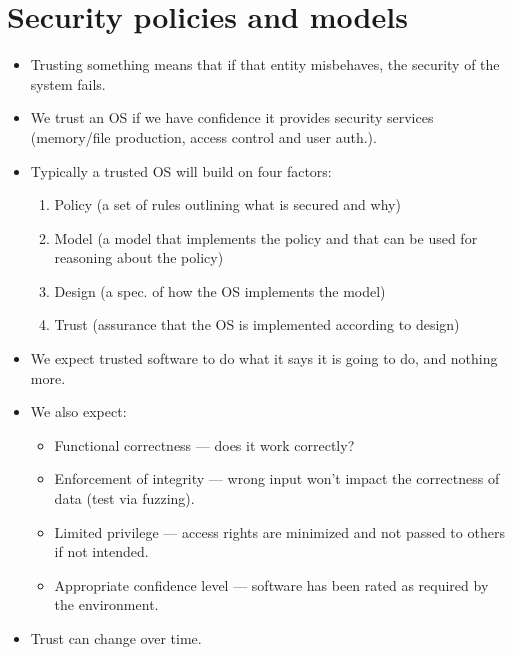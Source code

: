\documentclass{article}
\begin{document}
\section{Security policies and models}
\begin{itemize}
    \item Trusting something means that if that entity misbehaves, the security of the system fails.
    \item We trust an OS if we have confidence it provides security services (memory/file production, access control and user auth.).
    \item Typically a trusted OS will build on four factors:
        \begin{enumerate}
            \item Policy (a set of rules outlining what is secured and why)
            \item Model (a model that implements the policy and that can be used for reasoning about the policy)
            \item Design (a spec. of how the OS implements the model)
            \item Trust (assurance that the OS is implemented according to design)
        \end{enumerate}
    \item We expect trusted software to do what it says it is going to do, and nothing more.
    \item We also expect:
        \begin{itemize}
            \item Functional correctness --- does it work correctly?
            \item Enforcement of integrity --- wrong input won't impact the correctness of data (test via fuzzing).
            \item Limited privilege --- access rights are minimized and not passed to others if not intended.
            \item Appropriate confidence level --- software has been rated as required by the environment.
        \end{itemize}
    \item Trust can change over time.
\end{itemize}
\end{document}
